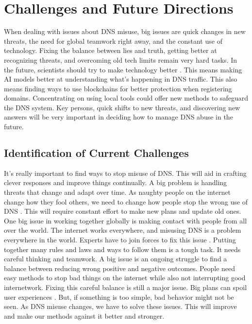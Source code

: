 \section{Challenges and Future Directions}

When dealing with issues about DNS misuse, big issues are quick changes in new threats, the need for global teamwork right away, and the constant use of technology. Fixing the balance between lies and truth, getting better at recognizing threats, and overcoming old tech limits remain very hard tasks. In the future, scientists should try to make technology better \cite{pour2023comprehensive}. This means making AI models better at understanding what's happening in DNS traffic. This also means finding ways to use blockchains for better protection when registering domains. Concentrating on using local tools could offer new methods to safeguard the DNS system. Key persons, quick shifts to new threats, and discovering new answers will be very important in deciding how to manage DNS abuse in the future.


\subsection{Identification of Current Challenges}

It's really important to find ways to stop misuse of DNS. This will aid in crafting clever responses and improve things continually. A big problem is handling threats that change and adapt over time. As naughty people on the internet change how they fool others, we need to change how people stop the wrong use of DNS \cite{bhattacharya2023dns}. This will require constant effort to make new plans and update old ones. One big issue in working together globally is making contact with people from all over the world. The internet works everywhere, and misusing DNS is a problem everywhere in the world. Experts have to join forces to fix this issue \cite{altulaihan2022cybersecurity}. Putting together many rules and laws and ways to follow them is a tough task. It needs careful thinking and teamwork. A big issue is an ongoing struggle to find a balance between reducing wrong positive and negative outcomes. People need easy methods to stop bad things on the internet while also not interrupting good internetwork. Fixing this careful balance is still a major issue. Big plans can spoil user experiences \cite{lyu2022survey}. But, if something is too simple, bad behavior might not be seen. As DNS misuse changes, we have to solve these issues. This will improve and make our methods against it better and stronger.

